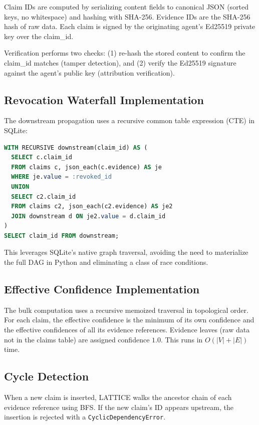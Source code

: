 \documentclass[11pt,twocolumn]{article}
\begin{document}
Claim IDs are computed by serializing content fields to canonical JSON (sorted keys, no whitespace) and hashing with SHA-256. Evidence IDs are the SHA-256 hash of raw data. Each claim is signed by the originating agent's Ed25519 private key over the claim\_id.

Verification performs two checks: (1) re-hash the stored content to confirm the claim\_id matches (tamper detection), and (2) verify the Ed25519 signature against the agent's public key (attribution verification).

\subsection{Revocation Waterfall Implementation}

The downstream propagation uses a recursive common table expression (CTE) in SQLite:

\begin{lstlisting}[language=SQL]
WITH RECURSIVE downstream(claim_id) AS (
  SELECT c.claim_id
  FROM claims c, json_each(c.evidence) AS je
  WHERE je.value = :revoked_id
  UNION
  SELECT c2.claim_id
  FROM claims c2, json_each(c2.evidence) AS je2
  JOIN downstream d ON je2.value = d.claim_id
)
SELECT claim_id FROM downstream;
\end{lstlisting}

This leverages SQLite's native graph traversal, avoiding the need to materialize the full DAG in Python and eliminating a class of race conditions.

\subsection{Effective Confidence Implementation}

The bulk computation uses a recursive memoized traversal in topological order. For each claim, the effective confidence is the minimum of its own confidence and the effective confidences of all its evidence references. Evidence leaves (raw data not in the claims table) are assigned confidence $1.0$. This runs in $O(|V| + |E|)$ time.

\subsection{Cycle Detection}

When a new claim is inserted, LATTICE walks the ancestor chain of each evidence reference using BFS. If the new claim's ID appears upstream, the insertion is rejected with a \texttt{CyclicDependencyError}.
\end{document}
